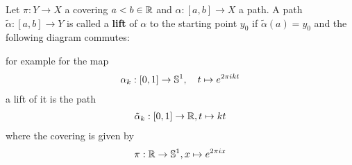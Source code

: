 \begin{dfn}[]
  Let $\pi: Y \to X$ a covering $a < b \in \mathbb{R}$ and $\alpha:[a,b] \to  X$ a path.
  A path $\tilde{\alpha}:[a,b] \to Y$ is called a \textbf{lift} of $\alpha$ to the starting point $y_0$ if $\tilde{\alpha}(a) = y_0$ and the following diagram commutes:
\begin{center}
\end{center}
\end{dfn}
for example for the map
\begin{align*}
  \alpha_k: [0,1] \to \mathbb{S}^{1}, \quad t \mapsto e^{2 \pi i k t}
\end{align*}
a lift of it is the path
\begin{align*}
  \tilde{\alpha}_k: [0,1] \to \mathbb{R}, t \mapsto kt
\end{align*}
where the covering is given by
\begin{align*}
  \pi: \mathbb{R} \to \mathbb{S}^{1}, x \mapsto  e^{2 \pi i x}
\end{align*}

